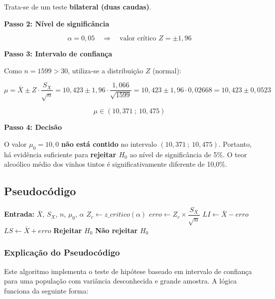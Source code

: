 \documentclass[12pt,a4paper]{article}
\begin{document}
Trata-se de um teste \textbf{bilateral (duas caudas)}.

\textbf{Passo 2: Nível de significância}

\[
  \alpha = 0{,}05 \quad \Rightarrow \quad \text{valor crítico } Z = \pm 1{,}96
\]

\textbf{Passo 3: Intervalo de confiança}

Como $n = 1599 > 30$, utiliza-se a distribuição $Z$ (normal):

\[
  \mu = \bar{X} \pm Z \cdot \frac{S_X}{\sqrt{n}}
      = 10{,}423 \pm 1{,}96 \cdot \frac{1{,}066}{\sqrt{1599}}
      = 10{,}423 \pm 1{,}96 \cdot 0{,}02668
      = 10{,}423 \pm 0{,}0523
\]

\[
  \boxed{\mu \in \left(10{,}371\ ;\ 10{,}475\right)}
\]

\textbf{Passo 4: Decisão}

O valor $\mu_0 = 10{,}0$ \textbf{não está contido} no intervalo $(10{,}371\ ;\ 10{,}475)$.
Portanto, há evidência suficiente para \textbf{rejeitar $H_0$} ao nível de
significância de 5\%. O teor alcoólico médio dos vinhos tintos é significativamente diferente
de 10,0\%.

\subsection*{Pseudocódigo}

\begin{algorithm}[H]
\caption{Teste de Hipótese -- Intervalo de Confiança (distribuição $Z$)}
\begin{algorithmic}[1]
  \State \textbf{Entrada:} $\bar{X}$, $S_X$, $n$, $\mu_0$, $\alpha$
  \State $Z_c \gets z\_critico(\alpha)$ 
  \State $erro \gets Z_c \times \dfrac{S_X}{\sqrt{n}}$
  \State $LI \gets \bar{X} - erro$
  \State $LS \gets \bar{X} + erro$
    \State \textbf{Rejeitar} $H_0$
  \Else
    \State \textbf{Não rejeitar} $H_0$
  \EndIf
\end{algorithmic}
\end{algorithm}

\subsubsection*{Explicação do Pseudocódigo}

Este algoritmo implementa o teste de hipótese baseado em intervalo de confiança para uma
população com variância desconhecida e grande amostra. A lógica funciona da seguinte forma:
\end{document}
